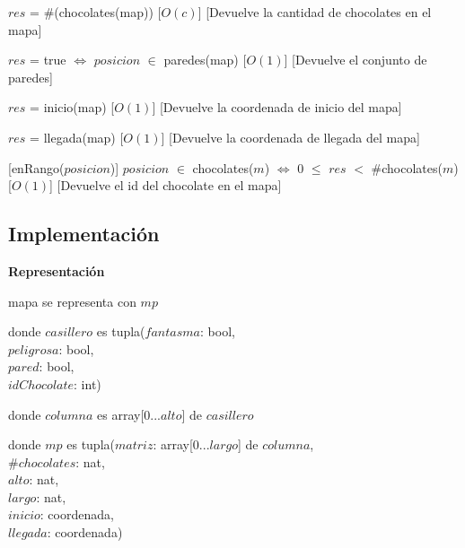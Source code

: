 \documentclass[10pt, a4paper]{article}
\begin{document}
\begin{Interfaz}
            {$res$ = \#(chocolates(map))}%
            [$O(c)$]
            [Devuelve la cantidad de chocolates en el mapa]

            {$res$ = true $\iff$ $posicion$ $\in$ paredes(map)}%
            [$O(1)$]
            [Devuelve el conjunto de paredes]

            {$res$ = inicio(map)}%
            [$O(1)$]
            [Devuelve la coordenada de inicio del mapa]

            {$res$ = llegada(map)}%
            [$O(1)$]
            [Devuelve la coordenada de llegada del mapa]

            \newpage

            [enRango($posicion$)]
            {$posicion$ $\in$ chocolates($m$) $\iff$ $0$ $\leq$ $res$ $<$ \#chocolates($m$)}%
            [$O(1)$]
            [Devuelve el id del chocolate en el mapa]

    \end{Interfaz}

    \newpage

    \subsection*{Implementación}

    \textbf{Representación}

    mapa se representa con $mp$

    donde $casillero$ es tupla($fantasma$: bool, \\
        \text{}\qquad\quad $peligrosa$: bool, \\
        \text{}\qquad\quad $pared$: bool, \\
        \text{}\qquad\quad $idChocolate$: int)

    donde $columna$ es array[0...$alto$] de $casillero$

    donde $mp$ es tupla($matriz$: array[0...$largo$] de $columna$, \\
        \text{}\qquad\quad \#$chocolates$: nat, \\
        \text{}\qquad\quad $alto$: nat, \\
        \text{}\qquad\quad $largo$: nat, \\
        \text{}\qquad\quad $inicio$: coordenada, \\
        \text{}\qquad\quad $llegada$: coordenada)
\end{document}
